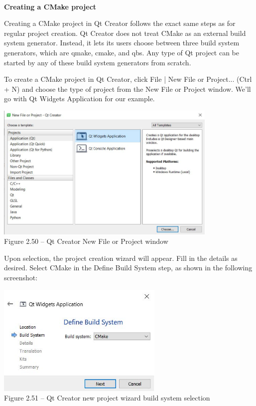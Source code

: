 \hspace*{\fill} \\ %
\noindent
\textbf{Creating a CMake project}

Creating a CMake project in Qt Creator follows the exact same steps as for regular project creation. Qt Creator does not treat CMake as an external build system generator. Instead, it lets its users choose between three build system generators, which are qmake, cmake, and qbs. Any type of Qt project can be started by any of these build system generators from scratch.

To create a CMake project in Qt Creator, click File | New File or Project... (Ctrl + N) and choose the type of project from the New File or Project window. We'll go with Qt Widgets Application for our example.

\begin{center}
\includegraphics[width=0.8\textwidth]{content/1/chapter2/images/50.jpg}\\
Figure 2.50 – Qt Creator New File or Project window
\end{center}

Upon selection, the project creation wizard will appear. Fill in the details as desired. Select CMake in the Define Build System step, as shown in the following screenshot:

\begin{center}
\includegraphics[width=0.6\textwidth]{content/1/chapter2/images/51.jpg}\\
Figure 2.51 – Qt Creator new project wizard build system selection
\end{center}

